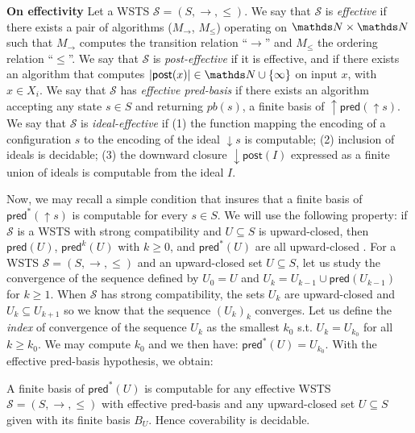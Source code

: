 \documentclass[runningheads]{llncs}
\newcommand{\pred}{\textsf{pred}}
\newcommand{\post}{\textsf{post}}
\begin{document}
\noindent
{\bf On effectivity}
Let a WSTS $\mathscr{S}=(S, \rightarrow, \leq)$. We say that $\mathscr{S}$ is {\em effective} if there exists a pair of algorithms
($M_\rightarrow$, $M_\leq$) operating on $\N \times \N$ such that
$ M_\rightarrow$ computes the transition relation “$\rightarrow$” and 
$M_\leq$ the ordering relation “$\leq$”.
We say that $\mathscr{S}$ is {\em post-effective} if it is effective, and if there
exists an algorithm that computes $|\post(x)| \in \N \cup \{\infty\}$ 
on input $x$, with $x \in X_i $. 
We say that $\mathscr{S}$ has {\em effective pred-basis} \cite{DBLP:journals/tcs/FinkelS01,DBLP:journals/iandc/AbdullaCJT00} if there exists an algorithm accepting
any state $s \in S$ and returning $pb(s)$, a finite basis of $\uparrow \pred(\uparrow s)$.
%
We say that $\mathscr{S}$
is {\em ideal-effective} \cite{BFM-ic17} if (1) the function mapping the encoding of a configuration $s$
to the encoding of the ideal $\downarrow s$ is computable; (2) inclusion of ideals is decidable; (3) the downward closure $\downarrow \post(I)$ expressed as a finite union of ideals is computable from the ideal $I$.
%

Now, we may recall a simple condition that insures that a finite basis of $\pred^*(\uparrow s )$ is computable for every $s \in S$.
We will use the following property: if $\mathscr{S}$ is a WSTS with strong compatibility and $U \subseteq S$ is upward-closed, then $\pred(U )$, $\pred^k(U )$ with $k\geq0$, and $\pred^*(U )$ are all upward-closed \cite{DBLP:journals/tcs/FinkelS01}.
For a WSTS $\mathscr{S}=(S, \rightarrow, \leq)$ and an upward-closed set $U  \subseteq S$, let us study the convergence of the sequence defined by $U_0=U$ and $U_k= U_{k-1} \cup \pred(U_{k-1})$ for $k \geq 1$. When $\mathscr{S}$ has strong compatibility, the sets $U_k$ are upward-closed and $U_k \subseteq U_{k+1}$ so we know that the sequence $(U_k)_k$ converges. Let us define the \emph{index} of convergence of the sequence $U_k$ as the smallest $k_0$ s.t. $U_k = U_{k_0}$ for all $k \geq k_0$. We may compute $k_0$ and we then have:  $\pred^*(U) = U_{k_0}$. 
With the effective pred-basis hypothesis, we obtain:

\begin{theorem}\cite{DBLP:journals/tcs/FinkelS01,DBLP:journals/iandc/AbdullaCJT00}
A finite basis of $ \pred^*(U)$ is computable for any effective WSTS $\mathscr{S}=(S, \rightarrow, \leq)$ with effective pred-basis and any upward-closed set $U \subseteq S$ given with its finite basis $B_U$. Hence coverability is decidable.
\end{theorem}
\end{document}
